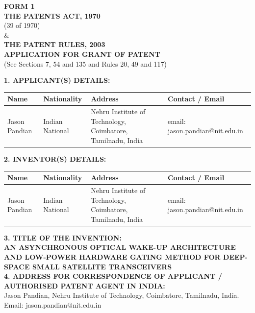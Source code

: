 \documentclass[12pt,a4paper]{article}
\begin{document}
\begin{center}
    \textbf{\large FORM 1} \\
    \vspace{0.2cm}
    \textbf{THE PATENTS ACT, 1970} \\
    (39 of 1970) \\
    \& \\
    \textbf{THE PATENT RULES, 2003} \\
    \vspace{0.4cm}
    \textbf{\large APPLICATION FOR GRANT OF PATENT} \\
    (See Sections 7, 54 and 135 and Rules 20, 49 and 117) \\
\end{center}

\vspace{0.5cm}

\noindent \textbf{1. APPLICANT(S) DETAILS:}
\begin{table}[h!]
\centering
\small
\begin{tabular}{|p{3cm}|p{2cm}|p{3.5cm}|p{6cm}|}
\hline
\textbf{Name} & \textbf{Nationality} & \textbf{Address} & \textbf{Contact / Email} \\ \hline
Jason Pandian & Indian National & Nehru Institute of Technology, Coimbatore, Tamilnadu, India & email: jason.pandian@nit.edu.in \\ \hline
\end{tabular}
\end{table}

\noindent \textbf{2. INVENTOR(S) DETAILS:}
\begin{table}[h!]
\centering
\small
\begin{tabular}{|p{3cm}|p{2cm}|p{3.5cm}|p{6cm}|}
\hline
\textbf{Name} & \textbf{Nationality} & \textbf{Address} & \textbf{Contact / Email} \\ \hline
Jason Pandian & Indian National & Nehru Institute of Technology, Coimbatore, Tamilnadu, India & email: jason.pandian@nit.edu.in \\ \hline
\end{tabular}
\end{table}

\noindent \textbf{3. TITLE OF THE INVENTION:} \\
\textbf{AN ASYNCHRONOUS OPTICAL WAKE-UP ARCHITECTURE AND LOW-POWER HARDWARE GATING METHOD FOR DEEP-SPACE SMALL SATELLITE TRANSCEIVERS} \\

\noindent \textbf{4. ADDRESS FOR CORRESPONDENCE OF APPLICANT / AUTHORISED PATENT AGENT IN INDIA:} \\
Jason Pandian, Nehru Institute of Technology, Coimbatore, Tamilnadu, India. Email: jason.pandian@nit.edu.in \\
\end{document}
